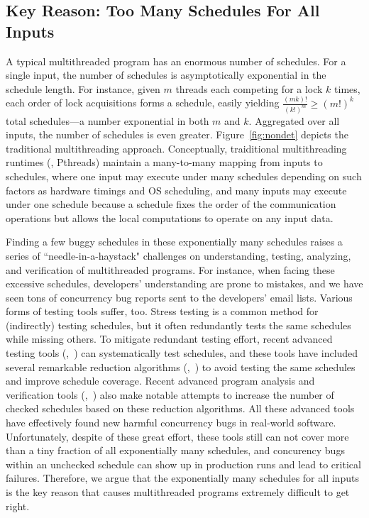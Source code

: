 \subsection{Key Reason: Too Many Schedules For All Inputs}

A typical multithreaded program has an enormous number of schedules.  For
a single input, the number of schedules is asymptotically exponential in
the schedule length.  For instance, given $m$ threads each competing for a
lock $k$ times, each order of lock acquisitions forms a schedule, easily
yielding $\frac{(mk)!}{(k!)^m} \ge (m!)^k$ total schedules---a number
exponential in both $m$ and $k$. Aggregated over all inputs, the number of
schedules is even greater. Figure~\ref{fig:nondet} depicts the traditional
multithreading approach. Conceptually, traiditional multithreading runtimes
(\eg, Pthreads) maintain a many-to-many mapping from inputs to schedules, where
one input may execute under many schedules depending on such factors as hardware
timings and OS scheduling, and many inputs may execute under one schedule
because a schedule fixes the order of the communication operations but allows
the local computations to operate on any input data.

Finding a few buggy schedules in these exponentially many schedules raises
a series of ``needle-in-a-haystack" challenges on understanding, testing,
analyzing, and verification of multithreaded programs. For instance, when facing
these excessive schedules, developers' understanding are prone to mistakes, and
we have seen tons of concurrency bug reports sent to the developers' email
lists. Various forms of testing tools suffer, too.  Stress testing
is a common method for (indirectly) testing schedules, but it often redundantly
tests the same schedules while missing others. To mitigate redundant testing
effort, recent advanced testing tools (\eg,~\cite{musuvathi:chess:osdi08,
modist:nsdi09, dbug:ssv10, demeter:sosp11}) can systematically test schedules,
and these tools have included several remarkable reduction algorithms
(\eg,~\cite{flanagan:dynamicpo, demeter:sosp11}) to avoid testing the same
schedules and improve schedule coverage. Recent advanced program
analysis and verification tools (\eg,~\cite{demeter:sosp11}) also make notable
attempts to increase the number of checked schedules based on these reduction
algorithms. All these advanced tools have effectively found new harmful
concurrency bugs in real-world software. Unfortunately, despite of these great
effort, these tools still can not cover more than a tiny fraction of all
exponentially many schedules, and concurency bugs within an unchecked schedule
can show up in production runs and lead to critical failures. Therefore, we
argue that the exponentially many schedules for all inputs is the key reason
that causes multithreaded programs extremely difficult to get right.


